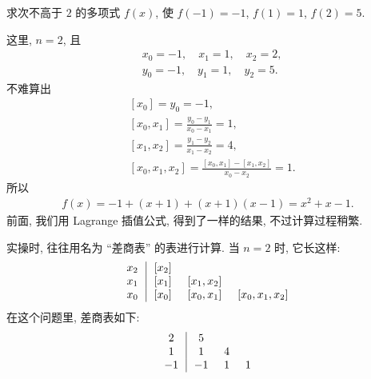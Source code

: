 \begin{example}
    求次不高于 $2$ 的多项式 $f(x)$, 使 $f(-1)=-1$, $f(1)=1$, $f(2)=5$.

    这里, $n = 2$, 且
    \begin{align*}
         & x_0 = -1, \quad x_1 = 1, \quad x_2 = 2, \\
         & y_0 = -1, \quad y_1 = 1, \quad y_2 = 5.
    \end{align*}
    不难算出
    \begin{align*}
         & [x_0] = y_0 = -1,                                \\
         & [x_0, x_1] = \frac{y_0 - y_1}{x_0 - x_1}
        = 1,                                                \\
         & [x_1, x_2] = \frac{y_1 - y_2}{x_1 - x_2}
        = 4,                                                \\
         & [x_0, x_1, x_2] = \frac{[x_0, x_1] - [x_1, x_2]}
        {x_0 - x_2} = 1.
    \end{align*}
    所以
    \begin{align*}
        f(x) = -1 + (x + 1) + (x + 1)(x - 1) = x^2 + x - 1.
    \end{align*}
    前面, 我们用 Lagrange 插值公式, 得到了一样的结果, 不过计算过程稍繁.

    实操时, 往往用名为 ``差商表'' 的表进行计算. 当 $n = 2$ 时, 它长这样:
    \begin{align*}
        \arraycolsep=0.25cm
        \begin{array}{c|ccc}
            x_2 & [x_2] & \          & \               \\
            x_1 & [x_1] & [x_1, x_2] & \               \\
            x_0 & [x_0] & [x_0, x_1] & [x_0, x_1, x_2] \\
        \end{array}
    \end{align*}
    在这个问题里, 差商表如下:
    \begin{align*}
        \arraycolsep=0.25cm
        \begin{array}{c|ccc}
            2  & 5  & \  & \ \\
            1  & 1  & 4  & \ \\
            -1 & -1 & 1  & 1 \\
        \end{array}
    \end{align*}
\end{example}

